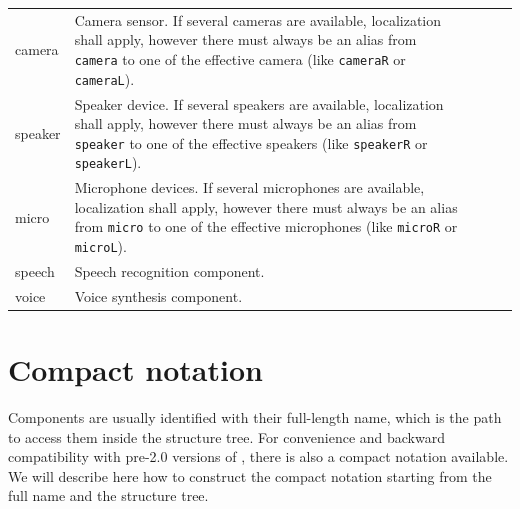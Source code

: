 \begin{center}
\begin{supertabular}{|m{2.312cm}|m{6.776cm}|m{2.629cm}|m{2.471cm}|m{2.1269999cm}|}
 \\\hline
camera &
Camera sensor. If several cameras are
available, localization shall apply, however there must always be an
alias from \texttt{camera} to one of the effective camera (like
\texttt{cameraR} or \texttt{cameraL}). &
 &
\code{{}-} &
 \\\hline
speaker &
Speaker device. If several speakers
are available, localization shall apply, however there must always be
an alias from \texttt{speaker} to one of the effective speakers (like
\texttt{speakerR} or \texttt{speakerL}). &
 &
\code{{}-} &
 \\\hline
micro  &
Microphone devices. If several
microphones are available, localization shall apply, however there must
always be an alias from \texttt{micro} to one of the effective
microphones (like \texttt{microR} or \texttt{microL}). &
 &
\code{{}-} &
 \\\hline
speech &
Speech recognition component. &
 &
\code{{}-} &
 \\\hline
voice &
Voice synthesis component. &
 &
\code{{}-} &
 \\\hline
\end{supertabular}
\end{center}


\section{Compact notation}

Components are usually identified with their full-length name, which is
the path to access them inside the structure tree. For convenience and
backward compatibility with pre-2.0 versions of \urbi, there is also a
compact notation available. We will describe here how to construct the
compact notation starting from the full name and the structure tree.

